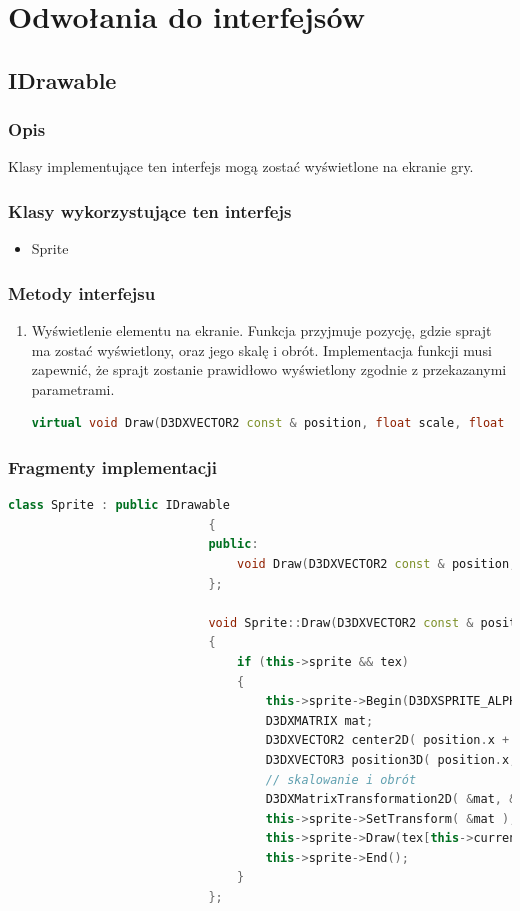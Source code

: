 \documentclass[a4paper,twoside]{article}
\begin{document}
			\section{Odwołania do interfejsów}
				\subsection{IDrawable}
					\subsubsection{Opis}
						Klasy implementujące ten interfejs mogą zostać wyświetlone na ekranie gry.
					\subsubsection{Klasy wykorzystujące ten interfejs}
						\begin{itemize}
							\item Sprite
						\end{itemize}
					\subsubsection{Metody interfejsu}
						\begin{enumerate}
							\item Wyświetlenie elementu na ekranie. Funkcja przyjmuje pozycję, gdzie sprajt ma zostać wyświetlony, oraz jego skalę i obrót. Implementacja funkcji musi zapewnić, że sprajt zostanie prawidłowo wyświetlony zgodnie z przekazanymi parametrami.
							\begin{lstlisting}[language=C++]
								virtual void Draw(D3DXVECTOR2 const & position, float scale, float rotation) = 0;
							\end{lstlisting}
						\end{enumerate}
					\subsubsection{Fragmenty implementacji}
						\begin{lstlisting}[language=C++]
							class Sprite : public IDrawable
							{
							public:
								void Draw(D3DXVECTOR2 const & position, float scale = 1.0f, float rotation = 0.0f) override;
							};
							
							void Sprite::Draw(D3DXVECTOR2 const & position, float scale, float rotation)
							{
								if (this->sprite && tex)
								{
									this->sprite->Begin(D3DXSPRITE_ALPHABLEND);
									D3DXMATRIX mat;
									D3DXVECTOR2 center2D( position.x + center.x, position.y + center.y );
									D3DXVECTOR3 position3D( position.x, position.y, 0.0f );
									// skalowanie i obrót
									D3DXMatrixTransformation2D( &mat, &center2D, NULL, new D3DXVECTOR2( scale, scale ), &center2D, rotation, NULL );
									this->sprite->SetTransform( &mat );
									this->sprite->Draw(tex[this->currentTex], NULL, NULL, &position3D, this->color);
									this->sprite->End();
								}
							};
						\end{lstlisting}
				\newpage
\end{document}
